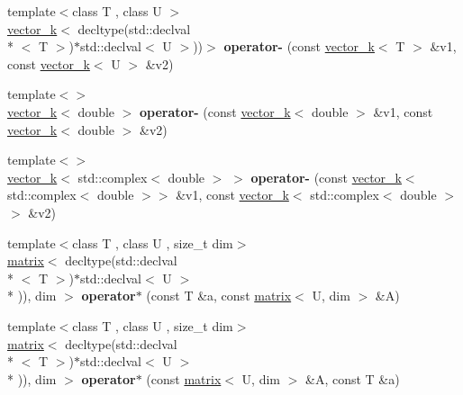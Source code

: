 \begin{DoxyCompactItemize}
\item 
\hypertarget{namespacekeycpp_a891589b60d1c968b44986f3b7d56586b}{{\footnotesize template$<$class T , class U $>$ }\\\hyperlink{classkeycpp_1_1vector__k}{vector\-\_\-k}$<$ decltype(std\-::declval\\*
$<$ T $>$)$\ast$std\-::declval$<$ U $>$))$>$ {\bfseries operator-\/} (const \hyperlink{classkeycpp_1_1vector__k}{vector\-\_\-k}$<$ T $>$ \&v1, const \hyperlink{classkeycpp_1_1vector__k}{vector\-\_\-k}$<$ U $>$ \&v2)}\label{namespacekeycpp_a891589b60d1c968b44986f3b7d56586b}

\item 
\hypertarget{namespacekeycpp_a2a6e4104db7159c74673aacae14286ef}{{\footnotesize template$<$$>$ }\\\hyperlink{classkeycpp_1_1vector__k}{vector\-\_\-k}$<$ double $>$ {\bfseries operator-\/} (const \hyperlink{classkeycpp_1_1vector__k}{vector\-\_\-k}$<$ double $>$ \&v1, const \hyperlink{classkeycpp_1_1vector__k}{vector\-\_\-k}$<$ double $>$ \&v2)}\label{namespacekeycpp_a2a6e4104db7159c74673aacae14286ef}

\item 
\hypertarget{namespacekeycpp_a95c0f9757ba86c696c6c5bfa874c8a49}{{\footnotesize template$<$$>$ }\\\hyperlink{classkeycpp_1_1vector__k}{vector\-\_\-k}$<$ std\-::complex$<$ double $>$ $>$ {\bfseries operator-\/} (const \hyperlink{classkeycpp_1_1vector__k}{vector\-\_\-k}$<$ std\-::complex$<$ double $>$$>$ \&v1, const \hyperlink{classkeycpp_1_1vector__k}{vector\-\_\-k}$<$ std\-::complex$<$ double $>$$>$ \&v2)}\label{namespacekeycpp_a95c0f9757ba86c696c6c5bfa874c8a49}

\item 
\hypertarget{namespacekeycpp_a0fb730e3fdb0eb44a13913518ce0afc1}{{\footnotesize template$<$class T , class U , size\-\_\-t dim$>$ }\\\hyperlink{classkeycpp_1_1matrix}{matrix}$<$ decltype(std\-::declval\\*
$<$ T $>$)$\ast$std\-::declval$<$ U $>$\\*
)), dim $>$ {\bfseries operator$\ast$} (const T \&a, const \hyperlink{classkeycpp_1_1matrix}{matrix}$<$ U, dim $>$ \&A)}\label{namespacekeycpp_a0fb730e3fdb0eb44a13913518ce0afc1}

\item 
\hypertarget{namespacekeycpp_a650b89b71e7516e560bb2be49b30aedd}{{\footnotesize template$<$class T , class U , size\-\_\-t dim$>$ }\\\hyperlink{classkeycpp_1_1matrix}{matrix}$<$ decltype(std\-::declval\\*
$<$ T $>$)$\ast$std\-::declval$<$ U $>$\\*
)), dim $>$ {\bfseries operator$\ast$} (const \hyperlink{classkeycpp_1_1matrix}{matrix}$<$ U, dim $>$ \&A, const T \&a)}\label{namespacekeycpp_a650b89b71e7516e560bb2be49b30aedd}


\end{DoxyCompactItemize}
